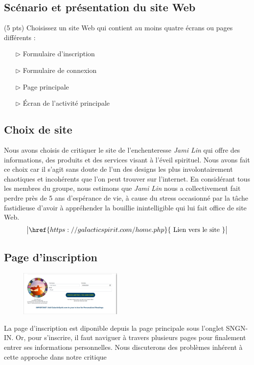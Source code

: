 \documentclass[9pt]{report}
\newcommand{\mathpazott}{\fontfamily{pplj}\selectfont}
\renewcommand{\texttt}[1]{{\scriptsize\mathpazott #1}}
\begin{document}
\begin{multicols*}{2}
  \small
\chapter{Scénario et présentation du site Web}



  \begin{Exercice}{(5 pts)}{}
  Choisissez un site Web qui contient au moins quatre écrans ou pages différents :     
  \begin{itemize}
    \item [$\rhd$ ] Formulaire d’inscription
    \item [$\rhd$ ] Formulaire de connexion  
    \item [$\rhd$ ] Page principale  
    \item [$\rhd$ ] Écran de l'activité principale 
  \end{itemize} 
  \end{Exercice}


  \section{Choix de site}
  Nous avons choisis de critiquer le site de l'enchenteresse \textit{Jami Lin} 
  qui offre des informations, des produits et des services visant à l'éveil 
  spirituel. Nous avons fait ce choix car il s'agit sans doute de l'un des 
  designs les plus involontairement chaotiques et incohérents que l'on peut trouver 
  sur l'internet. En considérant tous les membres du groupe, nous estimons 
  que \textit{Jami Lin}  nous a collectivement fait perdre près de 5 ans d'espérance de vie, 
  à cause du stress occasionné par la tâche fastidieuse d'avoir à appréhender la bouillie 
  inintelligible qui lui fait office de site Web. 
  \[ \big| \href{https://galacticspirit.com/home.php}{\text{ Lien vers le site }}  \big| \]

  \vspace{-1em}

  \section{Page d'inscription}
  \vspace{-2em}
  \begin{figure}[H]
    \begin{center}
      \includegraphics[width=0.45\textwidth]{SinupPage.png}
    \end{center}
  \end{figure}
  \vspace{-2.5em}
  La page d'inscription est diponible depuis la page principale sous l'onglet 
  \texttt{SNGN-IN}. Or, pour s'inscrire, il faut naviguer à travers plusieurs 
  pages pour finalement entrer ses informations personnelles. Nous discuterons 
  des problèmes inhérent à cette approche dans notre critique



\end{multicols*}
\end{document}
